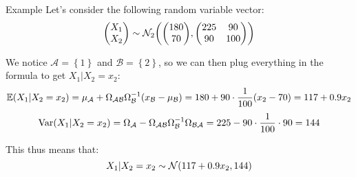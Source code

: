 \documentclass[a4paper]{article}
\begin{document}
\begin{parag}{Example}
    Let's consider the following random variable vector: 
    \[\begin{pmatrix} X_1 \\ X_2 \end{pmatrix} \followsdistr \mathcal{N}_2\left(\begin{pmatrix} 180 \\ 70 \end{pmatrix}, \begin{pmatrix} 225 & 90 \\ 90 & 100 \end{pmatrix} \right)\]
    
    We notice $\mathcal{A} = \left\{1\right\}$ and $\mathcal{B} = \left\{2\right\}$, so we can then plug everything in the formula to get $X_1 | X_2 = x_2$: 
    \[\exval\left(X_1 | X_2 = x_2\right) = \mu_{\mathcal{A}} + \Omega_{\mathcal{AB}} \Omega_{\mathcal{B}}^{-1} \left(x_{\mathcal{B}} - \mu_{\mathcal{B}}\right) = 180 + 90\cdot \frac{1}{100} \left(x_2 - 70\right) = 117 + 0.9x_2\] 
    \[\Var\left(X_1 | X_2 = x_2\right) = \Omega_{\mathcal{A}} - \Omega_{\mathcal{AB}} \Omega_{\mathcal{B}}^{-1} \Omega_{\mathcal{BA}} = 225 - 90\cdot \frac{1}{100} \cdot 90 = 144\]

    This thus means that: 
    \[X_1 | X_2 = x_2 \followsdistr \mathcal{N}\left(117 + 0.9x_2, 144\right)\]
\end{parag}
\end{document}
